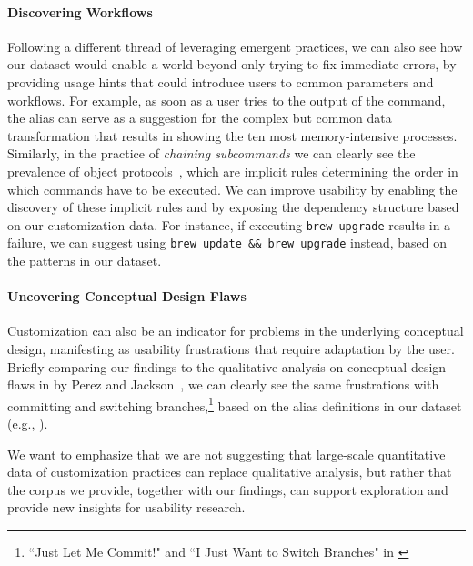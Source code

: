\paragraph*{\bf Discovering Workflows}
Following a different thread of leveraging emergent practices, we can also see how our dataset would enable a world beyond only trying to fix immediate errors, by providing usage hints that could introduce users to common parameters and workflows.
For example, as soon as a user tries to  the output of the  command, the alias  can serve as a suggestion for the complex but common data transformation that results in showing the ten most memory-intensive processes.
Similarly, in the practice of \emph{chaining subcommands} we can clearly see the prevalence of object protocols~\cite{beckman:11}, which are implicit rules determining the order in which commands have to be executed.
We can improve usability by enabling the discovery of these implicit rules and by exposing the dependency structure based on our customization data.
For instance, if executing \verb|brew upgrade| results in a failure, we can suggest using \verb|brew update && brew upgrade| instead, based on the patterns in our dataset. 

\paragraph*{\bf Uncovering Conceptual Design Flaws}

Customization can also be an indicator for problems in the underlying conceptual design, manifesting as usability frustrations that require adaptation by the user.
Briefly comparing our findings to the qualitative analysis on conceptual design flaws in  by Perez and Jackson~\cite{perez:13}, we can clearly see the same frustrations with committing and switching branches,\footnote{``Just Let Me Commit!" and ``I Just Want to Switch Branches" in \cite{perez:13}} based on the alias definitions in our dataset (e.g., ).

We want to emphasize that we are not suggesting that large-scale quantitative data of customization practices can replace qualitative analysis, but rather that the corpus we provide, together with our findings, can support exploration and provide new insights for usability research.

